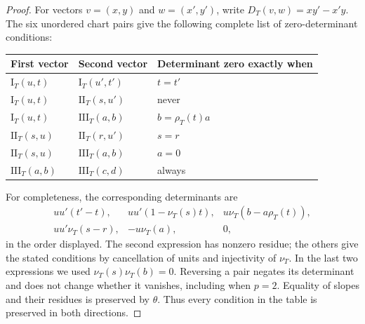 \documentclass[11pt]{article}
\begin{document}
\begin{proof}
For vectors $v=(x,y)$ and $w=(x',y')$, write
$D_T(v,w)=xy'-x'y$. The six unordered chart pairs give the following
complete list of zero-determinant conditions:
\begin{center}
\begin{tabular}{lll}
\toprule
First vector & Second vector & Determinant zero exactly when\\
\midrule
$\mathrm I_T(u,t)$ & $\mathrm I_T(u',t')$ & $t=t'$\\
$\mathrm I_T(u,t)$ & $\mathrm {II}_T(s,u')$ & never\\
$\mathrm I_T(u,t)$ & $\mathrm {III}_T(a,b)$ & $b=\rho_T(t)a$\\
$\mathrm {II}_T(s,u)$ & $\mathrm {II}_T(r,u')$ & $s=r$\\
$\mathrm {II}_T(s,u)$ & $\mathrm {III}_T(a,b)$ & $a=0$\\
$\mathrm {III}_T(a,b)$ & $\mathrm {III}_T(c,d)$ & always\\
\bottomrule
\end{tabular}
\end{center}
For completeness, the corresponding determinants are
\[
\begin{array}{lll}
 uu'(t'-t),&uu'(1-\nu_T(s)t),&u\nu_T(b-a\rho_T(t)),\\
 uu'\nu_T(s-r),&-u\nu_T(a),&0,
\end{array}
\]
in the order displayed. The second expression has nonzero residue;
the others give the stated conditions by cancellation of units and
injectivity of $\nu_T$. In the last two expressions we used
$\nu_T(s)\nu_T(b)=0$. Reversing a pair negates its determinant and
does not change whether it vanishes, including when $p=2$.
Equality of slopes and their residues is preserved by $\theta$.
Thus every condition in the table is preserved in both directions.
\end{proof}
\end{document}
